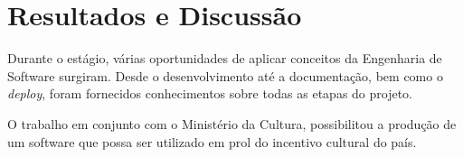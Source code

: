 \chapter[Resultados e Discussão]{Resultados e Discussão}
Durante o estágio, várias oportunidades de aplicar conceitos da Engenharia de Software surgiram.
Desde o desenvolvimento até a documentação, bem como o \textit{deploy}, foram fornecidos conhecimentos
sobre todas as etapas do projeto.

O trabalho em conjunto com o Ministério da Cultura, possibilitou a produção de um software que possa ser
utilizado em prol do incentivo cultural do país.

